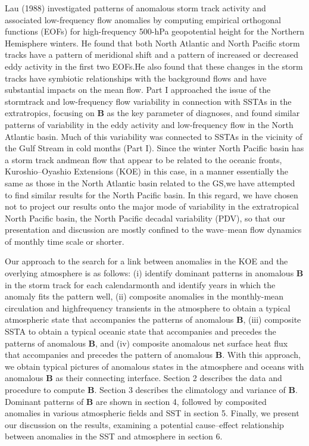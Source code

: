 \documentclass[twocol]{ametsocv6.2}
\begin{document}
Lau (1988) investigated patterns of anomalous storm
track activity and associated low-frequency flow anomalies
by computing empirical orthogonal functions (EOFs)
for high-frequency 500-hPa geopotential height for the
Northern Hemisphere winters. He found that both North
Atlantic and North Pacific storm tracks have a pattern of
meridional shift and a pattern of increased or decreased
eddy activity in the first two EOFs.He also found that these
changes in the storm tracks have symbiotic relationships
with the background flows and have substantial impacts on
the mean flow. Part I approached the issue of the stormtrack
and low-frequency flow variability in connection with
SSTAs in the extratropics, focusing on $\mathbf{B}$ as the key parameter
of diagnoses, and found similar patterns of variability
in the eddy activity and low-frequency flow in the
North Atlantic basin. Much of this variability was connected
to SSTAs in the vicinity of the Gulf Stream in cold
months (Part I). Since the winter North Pacific basin has a
storm track andmean flow that appear to be related to the
oceanic fronts, Kuroshio--Oyashio Extensions (KOE) in
this case, in a manner essentially the same as those in the
North Atlantic basin related to the GS,we have attempted
to find similar results for the North Pacific basin. In this
regard, we have chosen not to project our results onto the
major mode of variability in the extratropical North Pacific
basin, the North Pacific decadal variability (PDV), so
that our presentation and discussion are mostly confined
to the wave--mean flow dynamics of monthly time scale or
shorter.


Our approach to the search for a link between anomalies
in the KOE and the overlying atmosphere is as follows:
(i) identify dominant patterns in anomalous $\mathbf{B}$ in the
storm track for each calendarmonth and identify years in
which the anomaly fits the pattern well, (ii) composite
anomalies in the monthly-mean circulation and highfrequency
transients in the atmosphere to obtain a typical
atmospheric state that accompanies the patterns of
anomalous $\mathbf B$, (iii) composite SSTA to obtain a typical
oceanic state that accompanies and precedes the patterns
of anomalous $\mathbf B$, and (iv) composite anomalous net surface
heat flux that accompanies and precedes the pattern of
anomalous $\mathbf B$. With this approach, we obtain typical pictures
of anomalous states in the atmosphere and oceans
with anomalous $\mathbf{B}$ as their connecting interface.
Section 2 describes the data and procedure to compute
$\mathbf B$. Section 3 describes the climatology and variance of $\mathbf B$.
Dominant patterns of $\mathbf B$ are shown in section 4, followed by
composited anomalies in various atmospheric fields and
SST in section 5. Finally, we present our discussion on the
results, examining a potential cause--effect relationship
between anomalies in the SST and atmosphere in section 6.
\end{document}
